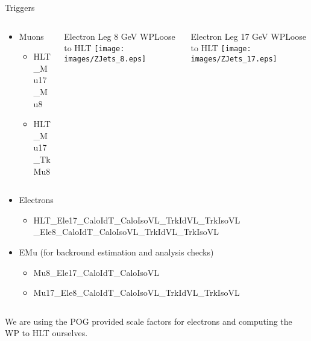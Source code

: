 \begin{frame}{Triggers}

  \begin{columns}
    \begin{column}{0.4\textwidth}
      \begin{itemize}
      \item
        \footnotesize Muons
        \begin{itemize}
          \scriptsize
        \item
          HLT\_Mu17\_Mu8
        \item
          HLT\_Mu17\_TkMu8
        \end{itemize}
      \end{itemize}
    \end{column}
    \begin{column}{0.3\textwidth}
      \begin{center}
        {\tiny Electron Leg 8 GeV WPLoose to HLT}
        \texttt{[image: images/ZJets\_8.eps]}
      \end{center}
    \end{column}
    \begin{column}{0.3\textwidth}
      \begin{center}
      {\tiny Electron Leg 17 GeV WPLoose to HLT}
      \texttt{[image: images/ZJets\_17.eps]}
      \end{center}
    \end{column}
  \end{columns}
  
  \begin{columns}
    \begin{column}{1.0\textwidth}
  \begin{itemize}
  \item
    \footnotesize  Electrons
    \begin{itemize}
      \tiny
    \item
      HLT\_Ele17\_CaloIdT\_CaloIsoVL\_TrkIdVL\_TrkIsoVL \_Ele8\_CaloIdT\_CaloIsoVL\_TrkIdVL\_TrkIsoVL
    \end{itemize}
  \item
    \footnotesize EMu (for backround estimation and analysis checks)
    \begin{itemize}
      \scriptsize
    \item
      Mu8\_Ele17\_CaloIdT\_CaloIsoVL
    \item
      Mu17\_Ele8\_CaloIdT\_CaloIsoVL\_TrkIdVL\_TrkIsoVL
    \end{itemize}
  \end{itemize}
  \end{column}
    \begin{column}{0.0\textwidth}
    \end{column}
  \end{columns}

\vspace{2em}

We are using the POG provided scale factors for electrons and computing the WP to HLT ourselves. 



\end{frame}
